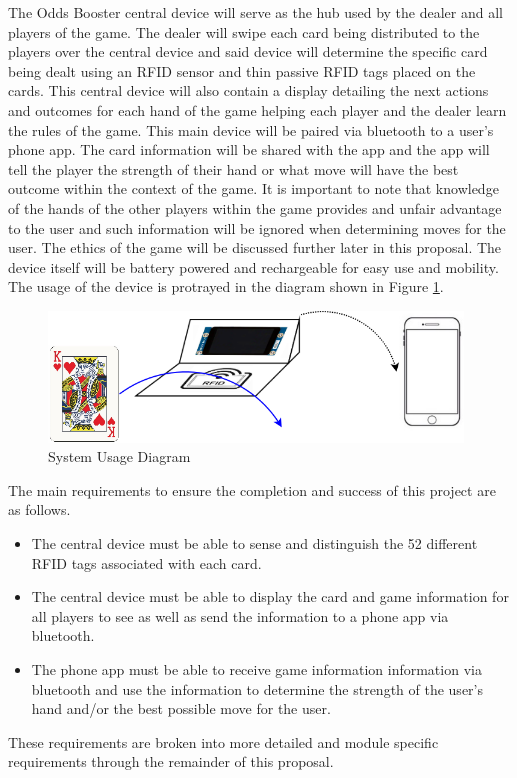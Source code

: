 \documentclass[12pt]{article}
\begin{document}
The Odds Booster central device will serve as the hub used by the dealer and all players of the game. The dealer will swipe each card being distributed to the players over the central device and said device will determine the specific card being dealt using an RFID sensor and thin passive RFID tags placed on the cards. This central device will also contain a display detailing the next actions and outcomes for each hand of the game helping each player and the dealer learn the rules of the game. This main device will be paired via bluetooth to a user's phone app. The card information will be shared with the app and the app will tell the player the strength of their hand or what move will have the best outcome within the context of the game. It is important to note that knowledge of the hands of the other players within the game provides and unfair advantage to the user and such information will be ignored when determining moves for the user. The ethics of the game will be discussed further later in this proposal. The device itself will be battery powered and rechargeable for easy use and mobility. The usage of the device is protrayed in the diagram shown in Figure \ref{fig:use_dia}.

\begin{figure}[h]
	\centering
	\includegraphics[width=0.98\textwidth]{ProposalUsageDiagram.png}
	\caption{System Usage Diagram}
	\label{fig:use_dia}
\end{figure}

\noindent
The main requirements to ensure the completion and success of this project are as follows.
\begin{itemize}
\item The central device must be able to sense and distinguish the 52 different RFID tags associated with each card.
\item The central device must be able to display the card and game information for all players to see as well as send the information to a phone app via bluetooth.
\item The phone app must be able to receive game information information via bluetooth and use the information to determine the strength of the user's hand and/or the best possible move for the user.
\end{itemize}
These requirements are broken into more detailed and module specific requirements through the remainder of this proposal.
\end{document}
